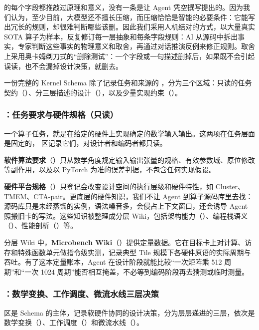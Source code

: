  的每个字段都推敲过原理和意义，没有一条是让 Agent 凭空撰写提出的。因为我们认为，至少目前，大模型还不擅长压缩，而压缩恰恰是智能的必要条件：它能写出冗长的规则，却很难判断哪些该删。因此我们采用人机结对的方式，以大量真实 SOTA 算子为样本，反复修订每一层抽象和每条字段规则：AI 从源码中拆出事实，专家判断这些事实的物理意义和取舍，再通过对话推演反例来修正规则。取舍上采用奥卡姆剃刀式的“删除测试”：一个字段或一句描述删掉后，如果既不会引起误读，也不会漏掉设计决策，就删去。


一份完整的 Kernel Schema 除了记录任务和来源的 ，分为三个区域：只读的任务契约（）、分三层描述的设计（），以及少量实现约束（）。


\subsubsection{：任务要求与硬件规格（只读）}\label{sec:schema-contract}
一个算子任务，就是在给定的硬件上实现确定的数学输入输出。这两项在任务层面是固定的， 区记录它们，对设计者和编码者都只读。


\textbf{软件算法要求}（）只从数学角度规定输入输出张量的规格、有效参数域、原位修改等副作用，以及以 PyTorch  为准的误差判据，不包含任何实现假设。


\textbf{硬件平台规格}（）只登记会改变设计空间的执行层级和硬件特性，如 Cluster、TMEM、CTA-pair。更底层的硬件知识，我们不让 Agent 到算子源码库里去找：源码库只是未经蒸馏的实例，语法噪音多，会侵占上下文窗口，还会诱导 Agent 照搬旧卡的写法。这些知识被整理成分层 Wiki，包括架构能力（）、编程栈语义（）、性能剖析（）等。


分层 Wiki 中，\textbf{Microbench Wiki}（）提供定量数据。它在目标卡上对计算、访存和特殊函数单元做指令级实测，记录典型 Tile 规模下各硬件原语的实际周期与吞吐。有了这本定量账本，Agent 在设计阶段就能比较“一次矩阵乘 512 周期”和“一次  1024 周期”能否相互掩盖，不必等到编码阶段再去猜测或临时测量。


\subsubsection{：数学变换、工作调度、微流水线三层决策}\label{sec:schema-design}
 区是 Schema 的主体，记录软硬件协同的设计决策，分为层层递进的三层，依次是数学变换（）、工作调度（）和微流水线（）。


